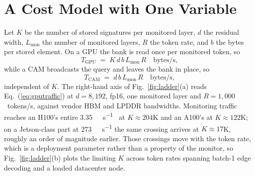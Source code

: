 \documentclass[conference]{IEEEtran}
\newcommand{\cam}{{CAM}\xspace}
\begin{document}
\section{A Cost Model with One Variable}
\label{sec:Scaling}
\label{subsec:CostModel}
\label{subsec:Ladder}


Let $K$ be the number of stored signatures per monitored layer, $d$ the
residual width, $L_{\mathrm{mon}}$ the number of monitored layers, $R$
the token rate, and $b$ the bytes per stored element. On a GPU the bank
is read once per monitored token, so
%
\begin{equation}
T_{\mathrm{GPU}} \;=\; K \, d \, b \, L_{\mathrm{mon}} \, R
\quad\text{bytes/s,}
\label{eq:gputraffic}
\end{equation}
%
while a \cam broadcasts the query and leaves the bank in place, so
%
\begin{equation}
T_{\mathrm{CAM}} \;=\; d \, b \, L_{\mathrm{mon}} \, R
\quad\text{bytes/s,}
\label{eq:camtraffic}
\end{equation}
%
independent of $K$. The right-hand axis of Fig.~\ref{fig:ladder}(a)
reads Eq.~(\ref{eq:gputraffic}) at $d=8{,}192$, fp16, one monitored
layer and $R=1{,}000$~tokens/s, against vendor HBM and LPDDR
bandwidths. Monitoring traffic reaches an H100's entire
\qty{3.35}{\tera\byte\per\second}~\cite{nvidia_h100} at
$K\!\approx\!204$K and an A100's at $K\!\approx\!122$K; on a
Jetson-class part at \qty{273}{\giga\byte\per\second} the same
crossing arrives at $K\!\approx\!17$K, roughly an order of magnitude
earlier. Those crossings move with the token rate, which is a
deployment parameter rather than a property of the monitor, so
Fig.~\ref{fig:ladder}(b) plots the limiting $K$ across token rates
spanning batch-1 edge decoding and a loaded datacenter node.
\end{document}

